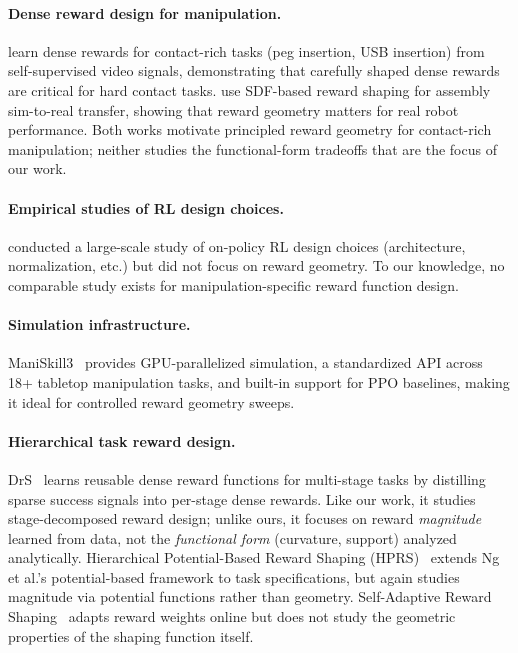 \documentclass{article}
\begin{document}
\paragraph{Dense reward design for manipulation.}
\citet{wu2021learning} learn dense rewards for contact-rich tasks (peg insertion, USB
insertion) from self-supervised video signals, demonstrating that carefully shaped dense
rewards are critical for hard contact tasks. \citet{tang2023industreal} use SDF-based
reward shaping for assembly sim-to-real transfer, showing that reward geometry matters
for real robot performance. Both works motivate principled reward geometry for
contact-rich manipulation; neither studies the functional-form tradeoffs that are the
focus of our work.

\paragraph{Empirical studies of RL design choices.}
\citet{andrychowicz2020matters} conducted a large-scale study of on-policy RL design
choices (architecture, normalization, etc.) but did not focus on reward geometry.
To our knowledge, no comparable study exists for manipulation-specific reward function
design.

\paragraph{Simulation infrastructure.}
ManiSkill3~\citep{maniskill3} provides GPU-parallelized simulation, a standardized
API across 18+ tabletop manipulation tasks, and built-in support for PPO baselines,
making it ideal for controlled reward geometry sweeps.

\paragraph{Hierarchical task reward design.}
DrS~\citep{zhuang2024drs} learns reusable dense reward functions for multi-stage tasks
by distilling sparse success signals into per-stage dense rewards. Like our work, it
studies stage-decomposed reward design; unlike ours, it focuses on reward
\emph{magnitude} learned from data, not the \emph{functional form} (curvature, support)
analyzed analytically. Hierarchical Potential-Based Reward Shaping (HPRS)~\citep{demir2024hprs}
extends Ng et al.'s potential-based framework to task specifications, but again studies
magnitude via potential functions rather than geometry.
Self-Adaptive Reward Shaping~\citep{selfadaptive2024} adapts reward weights online
but does not study the geometric properties of the shaping function itself.
\end{document}
